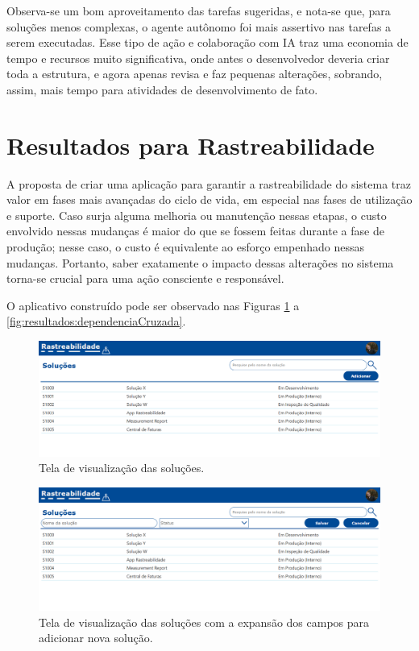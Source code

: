 	Observa-se um bom aproveitamento das tarefas sugeridas, e nota-se que, para soluções menos complexas, o agente autônomo foi mais assertivo nas tarefas a serem executadas. Esse tipo de
	ação e colaboração com IA traz uma economia de tempo e recursos muito significativa, onde antes o desenvolvedor deveria criar toda a estrutura, e agora apenas revisa e faz pequenas alterações,
	sobrando, assim, mais tempo para atividades de desenvolvimento de fato.

	\section{Resultados para Rastreabilidade}

	A proposta de criar uma aplicação para garantir a rastreabilidade do sistema traz valor em fases mais avançadas do ciclo de vida, em especial nas fases de utilização e suporte. Caso surja
	alguma melhoria ou manutenção nessas etapas, o custo envolvido nessas mudanças é maior do que se fossem feitas durante a fase de produção; nesse caso, o custo é equivalente ao esforço empenhado nessas
	mudanças. Portanto, saber exatamente o impacto dessas alterações no sistema torna-se crucial para uma ação consciente e responsável.

	O aplicativo construído pode ser observado nas Figuras \ref{fig:resultados:solucoes} a \ref{fig:resultados:dependenciaCruzada}.

	\begin{figure}[!htb]
		\centering
		\includegraphics[width=1\textwidth]{./figuras/solucoes.png}
		\caption{Tela de visualização das soluções.}
		\label{fig:resultados:solucoes}
	\end{figure}

	\begin{figure}[!htb]
		\centering
		\includegraphics[width=1\textwidth]{./figuras/solucoesAdicionar.png}
		\caption{Tela de visualização das soluções com a expansão dos campos para adicionar nova solução.}
		\label{fig:resultados:solucoesAdicionar}
	\end{figure}

